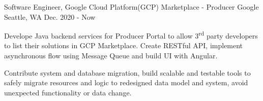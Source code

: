 


\begin{cventries}


\cventry
{Software Engineer, Google Cloud Platform(GCP) Marketplace - Producer} %
{Google} %
{Seattle, WA} %
{Dec. 2020 - Now} %
{
\begin{cvitems}
	\item{Develope Java backend services for Producer Portal to allow 3\textsuperscript{rd} party developers to list their solutions in GCP Marketplace. Create RESTful API, implement asynchronous flow using Message Queue and build UI with Angular.} %
	\item{Contribute system and database migration, build scalable and testable tools to safely migrate resources and logic to redesigned data model and system, avoid unexpected functionality or data change.} %
\end{cvitems}
}



\end{cventries}
